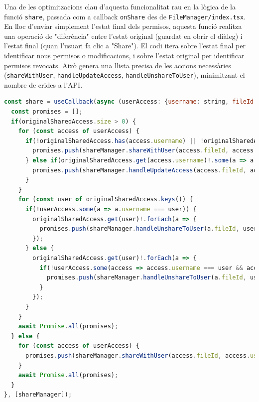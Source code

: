 Una de les optimitzacions clau d'aquesta funcionalitat rau en la lògica de la funció \texttt{share}, passada com a callback \texttt{onShare} des de \texttt{FileManager/index.tsx}. En lloc d'enviar simplement l'estat final dels permisos, aquesta funció realitza una operació de "diferència" entre l'estat original (guardat en obrir el diàleg) i l'estat final (quan l'usuari fa clic a "Share"). El codi itera sobre l'estat final per identificar nous permisos o modificacions, i sobre l'estat original per identificar permisos revocats. Això genera una llista precisa de les accions necessàries (\texttt{shareWithUser}, \texttt{handleUpdateAccess}, \texttt{handleUnshareToUser}), minimitzant el nombre de crides a l'API.

\begin{lstlisting}[language=javascript, caption={Lògica de comparació de permisos a `FileManager/index.tsx`}]
const share = useCallback(async (userAccess: {username: string, fileId: string, accessType: 'READ' | 'WRITE' }[], originalSharedAccess: Map<string, {username: string, fileId: string, accessType: 'READ' | 'WRITE' }[]>) => {
  const promises = [];
  if(originalSharedAccess.size > 0) { 
    for (const access of userAccess) {
      if(!originalSharedAccess.has(access.username) || !originalSharedAccess.get(access.username)!.some(a => a.fileId === access.fileId)) {
        promises.push(shareManager.shareWithUser(access.fileId, access.username, access.accessType));
      } else if(originalSharedAccess.get(access.username)!.some(a => a.fileId === access.fileId && a.accessType !== access.accessType)) {
        promises.push(shareManager.handleUpdateAccess(access.fileId, access.username, access.accessType));
      }
    }
    for (const user of originalSharedAccess.keys()) {
      if(!userAccess.some(a => a.username === user)) {
        originalSharedAccess.get(user)!.forEach(a => {
          promises.push(shareManager.handleUnshareToUser(a.fileId, user));
        });
      } else {
        originalSharedAccess.get(user)!.forEach(a => {
          if(!userAccess.some(access => access.username === user && access.fileId === a.fileId)) {
            promises.push(shareManager.handleUnshareToUser(a.fileId, user));
          }
        });
      }
    }
    await Promise.all(promises);
  } else {
    for (const access of userAccess) {
      promises.push(shareManager.shareWithUser(access.fileId, access.username, access.accessType));
    }
    await Promise.all(promises);
  }
}, [shareManager]);
\end{lstlisting}


